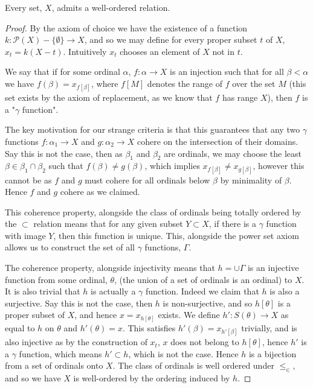 \documentclass[]{article}
\begin{document}
 \begin{thm}  \label{thm:well-ordering}
 	Every set, $X$, admits a well-ordered relation.
 \end{thm}

 \begin{proof}
		 By the axiom of choice we have the existence of a function $k: \mathcal{P}(X) - \{\emptyset\} \to X$, and so we may define for every proper subset  $t$ of $X$, $x_t = k(X - t)$. Intuitively $x_t$ chooses an element of $X$ not in $t$.

		 We say that if for some ordinal $\alpha$, $f: \alpha \to X$ is an injection such that for all  $\beta < \alpha$ we have $f(\beta) = x_{f[\beta]}$, where $f[M]$ denotes the range of $f$ over the set $M$ (this set exists by the axiom of replacement, as we know that $f$ has range $X$), then $f$ is a "$\gamma$ function".

		 The key motivation for our strange criteria is that this guarantees that any two $\gamma$ functions $f: \alpha_1 \to X$ and $g: \alpha_2 \to X$ cohere on the intersection of their domains. Say this is not the case, then as  $\beta_1$ and $\beta_2$ are ordinals, we may choose the least $\beta \in \beta_1 \cap \beta_2$ such that $f(\beta) \neq g(\beta)$, which implies $x_{f[\beta]} \neq x_{g[\beta]}$, however this cannot be as $f$ and $g$ must cohere for all ordinals below $\beta$ by minimality of $\beta$. Hence $f$ and $g$ cohere as we claimed.

		 This coherence property, alongside the class of ordinals being totally ordered by the $\subset$ relation means that for any given subset $Y \subset X$, if there is a $\gamma$ function with image $Y$, then this function is unique. This, alongside the power set axiom allows us to construct the set of all $\gamma$ functions, $\Gamma$.

		 The coherence property, alongside injectivity means that  $h = \cup \Gamma$ is an injective function from some ordinal, $\theta$, (the union of a set of ordinals is an ordinal) to $X$. It is also trivial that $h$ is actually a $\gamma$ function. Indeed we claim that $h$ is also a surjective. Say this is not the case, then $h$ is non-surjective, and so $h[\theta]$ is a proper subset of $X$, and hence $x = x_{h[\theta]}$ exists. We define $h': S(\theta) \to X$ as equal to $h$ on $\theta$ and $h'(\theta) = x$. This satisfies $h'(\beta) = x_{h'[\beta]}$ trivially, and is also injective as by the construction of $x_t$, $x$ does not belong to $h[\theta]$, hence  $h'$ is a $\gamma$ function, which means $h' \subset h$, which is not the case. Hence $h$ is a bijection from a set of ordinals onto $X$. The class of ordinals is well ordered under $\leq_\in$, and so we have $X$ is well-ordered by the ordering induced by $h$.
 \end{proof}
		
\end{document}
